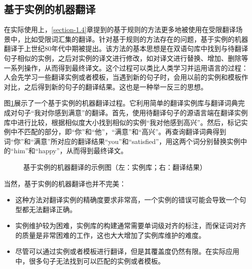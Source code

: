 \subsection{基于实例的机器翻译}

\parinterval 在实际使用上，\ref{section-1.4}章提到的基于规则的方法更多地被使用在受限翻译场景中，比如受限词汇集的翻译。针对基于规则的方法存在的问题，基于实例的机器翻译于上世纪80年代中期被提出。该方法的基本思想是在双语句库中找到与待翻译句子相似的实例，之后对实例的译文进行修改，如对译文进行替换、增加、删除等一系列操作，从而得到最终译文。这个过程可以类比人类学习并运用语言的过程：人会先学习一些翻译实例或者模板，当遇到新的句子时，会用以前的实例和模板作对比，之后得到新的句子的翻译结果。这也是一种举一反三的思想。

\parinterval 图\ref{fig:1-13}展示了一个基于实例的机器翻译过程。它利用简单的翻译实例库与翻译词典完成对句子“我对你感到满意”的翻译。首先，使用待翻译句子的源语言端在翻译实例库中进行比较，根据相似度大小找到相似的实例“我对他感到高兴”。然后，标记实例中不匹配的部分，即“你”和“他”，“满意”和“高兴”。再查询翻译词典得到词“你”和“满意”所对应的翻译结果“you”和“satisfied”，用这两个词分别替换实例中的“him”和“happy”，从而得到最终译文。

\begin{figure}[htp]
    \centering

    \caption{基于实例的机器翻译的示例图（左：实例库；右：翻译结果）}
    \label{fig:1-13}
\end{figure}

\parinterval 当然，基于实例的机器翻译也并不完美：

\begin{itemize}
\vspace{0.5em}
\item 这种方法对翻译实例的精确度要求非常高，一个实例的错误可能会导致一个句型都无法翻译正确。
\vspace{0.5em}
\item 实例维护较为困难，实例库的构建通常需要单词级对齐的标注，而保证词对齐的质量是非常困难的工作，这也大大增加了实例库维护的难度。
\vspace{0.5em}
\item 尽管可以通过实例或者模板进行翻译，但是其覆盖度仍然有限。在实际应用中，很多句子无法找到可以匹配的实例或者模板。
\vspace{0.5em}
\end{itemize}

